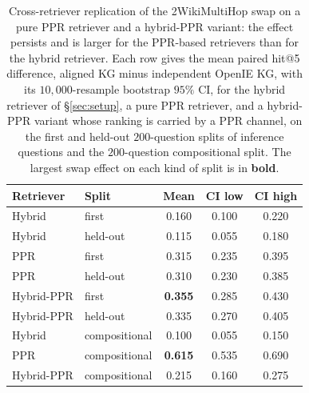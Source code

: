\documentclass[11pt]{article}
\newcommand{\best}[1]{\textbf{#1}}          %
\begin{document}
\begin{table}[ht]\centering\small
\setlength{\tabcolsep}{4pt}
\begin{tabular}{llccc}
\toprule
Retriever & Split & Mean & CI low & CI high\\
\midrule
Hybrid & first & 0.160 & 0.100 & 0.220\\
Hybrid & held-out & 0.115 & 0.055 & 0.180\\
PPR & first & 0.315 & 0.235 & 0.395\\
PPR & held-out & 0.310 & 0.230 & 0.385\\
Hybrid-PPR & first & \best{0.355} & 0.285 & 0.430\\
Hybrid-PPR & held-out & 0.335 & 0.270 & 0.405\\
\midrule
Hybrid & compositional & 0.100 & 0.055 & 0.150\\
PPR & compositional & \best{0.615} & 0.535 & 0.690\\
Hybrid-PPR & compositional & 0.215 & 0.160 & 0.275\\
\bottomrule
\end{tabular}
\caption{Cross-retriever replication of the 2WikiMultiHop swap on a pure PPR retriever and a hybrid-PPR variant: the effect persists and is larger for the PPR-based retrievers than for the hybrid retriever. Each row gives the mean paired hit@5 difference, aligned KG minus independent OpenIE KG, with its $10{,}000$-resample bootstrap $95\%$ CI, for the hybrid retriever of \S\ref{sec:setup}, a pure PPR retriever, and a hybrid-PPR variant whose ranking is carried by a PPR channel, on the first and held-out $200$-question splits of inference questions and the $200$-question compositional split. The largest swap effect on each kind of split is in \best{bold}.}
\label{tab:swapreplication}
\end{table}
\end{document}
